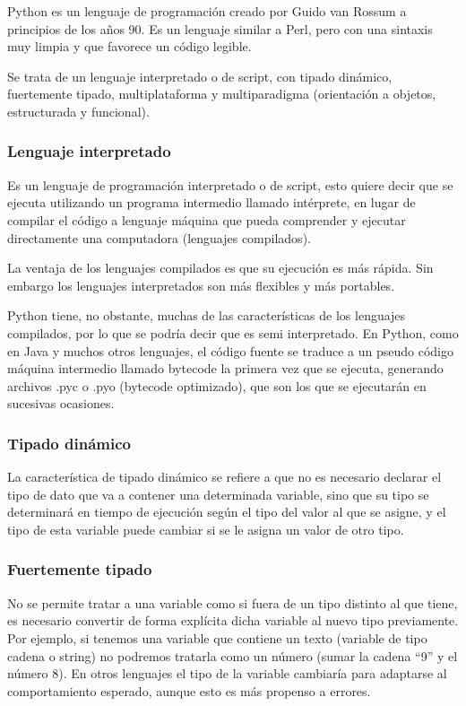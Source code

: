 \documentclass[12pt,a4paper]{report}
\begin{document}
\begin{itemize}
Python es un lenguaje de programación creado por Guido van Rossum a principios de los años 90.  Es un lenguaje similar a Perl, pero con una sintaxis muy limpia y que favorece un código legible.

Se trata de un lenguaje interpretado o de script, con tipado dinámico, fuertemente tipado, multiplataforma y multiparadigma (orientación a objetos, estructurada y funcional).

			\subsubsection{Lenguaje interpretado}

Es un lenguaje de programación interpretado o de script, esto quiere decir que se ejecuta utilizando un programa intermedio llamado intérprete, en lugar de compilar el código a lenguaje máquina que pueda comprender y ejecutar directamente una computadora (lenguajes compilados).

La ventaja de los lenguajes compilados es que su ejecución es más rápida. Sin embargo los lenguajes interpretados son más flexibles y más portables.

Python tiene, no obstante, muchas de las características de los lenguajes compilados, por lo que se podría decir que es semi interpretado. En Python, como en Java y muchos otros lenguajes, el código fuente se
traduce a un pseudo código máquina intermedio llamado bytecode la primera vez que se ejecuta, generando archivos .pyc o .pyo (bytecode optimizado), que son los que se ejecutarán en sucesivas ocasiones.


			\subsubsection{Tipado dinámico}

La característica de tipado dinámico se refiere a que no es necesario declarar el tipo de dato que va a contener una determinada variable, sino que su tipo se determinará en tiempo de ejecución según el tipo del valor al que se asigne, y el tipo de esta variable puede cambiar si se le asigna un valor de otro tipo.


			\subsubsection{Fuertemente tipado}

No se permite tratar a una variable como si fuera de un tipo distinto al que tiene, es necesario convertir de forma explícita dicha variable al nuevo tipo previamente. Por ejemplo, si tenemos una variable que contiene un texto (variable de tipo cadena o string) no podremos tratarla como un número (sumar la cadena “9” y el número 8). En otros lenguajes el tipo de la variable cambiaría para adaptarse al comportamiento esperado, aunque esto es más propenso a errores.


\end{itemize}
\end{document}
